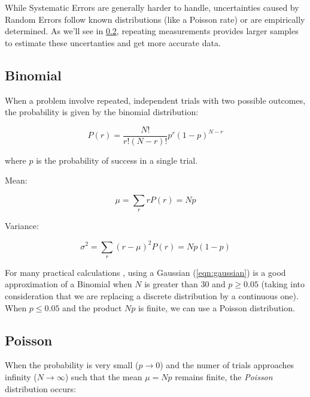 While Systematic Errors are generally harder to handle, uncertainties caused by Random Errors follow known distributions (like a Poisson rate) or are empirically determined. As we'll see in \ref{distributions1}, repeating measurements provides larger samples to estimate these uncertanties and get more accurate data.


\subsection{Binomial}

When a problem involve repeated, independent trials with two possible outcomes, the probability is given by the binomial distribution:

\begin{equation}
	P(r)= \frac{N! }{ r! \left( N-r \right)! } p^r (1-p)^{N-r}
\end{equation}

where $p$ is the probability of success in a single trial.


Mean:

\begin{equation}
	\mu = \sum_{r}rP(r) = Np
\end{equation}

Variance:

\begin{equation}
	\sigma^2=\sum_r(r-\mu)^2P(r) = Np(1-p)
\end{equation}

For many practical calculations \cite{leo2012techniques}, using a Gaussian (\ref{eqn:gaussian}) is a good approximation of a Binomial when $N$ is greater than 30 and $p\geq0.05$ (taking into consideration that we are replacing a discrete distribution by a continuous one). When $p\leq0.05$ and the product $Np$ is finite, we can use a Poisson distribution.

\subsection{Poisson}
\label{distributions1}

When the probability is very small ($p \rightarrow 0$) and the numer of trials approaches infinity ($N \rightarrow \infty$) such that the mean $\mu = N p$ remains finite, the \textit{Poisson} distribution occurs:


